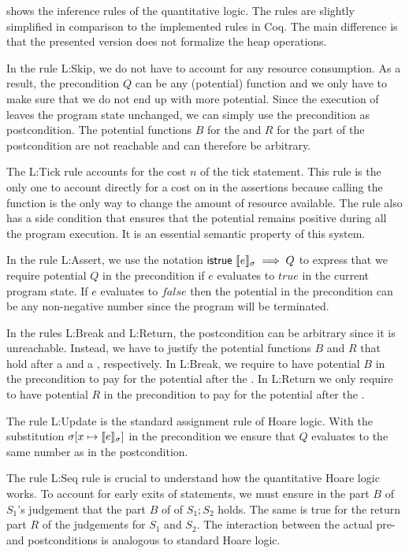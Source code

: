 \documentclass[nocopyrightspace,preprint,pldi]{sigplanconf-pldi15}
\newcommand{\pref}[1]{\prettyref{#1}}
\begin{document}
{\pref{fig:logicapp} shows the inference rules of the quantitative logic.
The rules are slightly simplified in comparison to the implemented
rules in Coq.  The main difference is that the presented version does
not formalize the heap operations.

In the rule {\sc L:Skip}, we do not have to account for any resource
consumption.  As a result, the precondition $Q$ can be any (potential)
function and we only have to make sure that we do not end up with more
potential.  Since the execution of  leaves the program
state unchanged, we can simply use the precondition as postcondition.
The potential functions $B$ for the  and $R$ for the
 part of the postcondition are not reachable and can
therefore be arbitrary.

The {\sc L:Tick} rule accounts for the cost $n$ of the tick statement.
This rule is the only one to account directly for a cost on in the
assertions because calling the  function is the only way to
change the amount of resource available.
The rule also has a side condition that ensures that the potential
remains positive during all the program execution.  It is an
essential semantic property of this system.

In the rule {\sc L:Assert}, we use the notation
$\mathsf{istrue}~\llbracket e \rrbracket_{\sigma} \implies Q$ to express that we
require potential $Q$ in the precondition if $e$ evaluates to
$\mathit{true}$ in the current program state.  If $e$ evaluates to
$\mathit{false}$ then the potential in the precondition can be any
non-negative number since the program will be terminated.

In the rules {\sc L:Break} and {\sc L:Return}, the postcondition can
be arbitrary since it is unreachable.  Instead, we have to justify the
potential functions $B$ and $R$ that hold after a  and a
, respectively.  In {\sc L:Break}, we require to have
potential $B$ in the precondition to pay for the potential after the
.  In {\sc L:Return} we only require to have potential
$R$ in the precondition to pay for the potential after the
.

The rule {\sc L:Update} is the standard assignment rule of Hoare
logic.  With the substitution $\sigma[x \mapsto \llbracket e \rrbracket_{\sigma}]$ in
the precondition we ensure that $Q$ evaluates to the same number as in
the postcondition.

The rule {\sc L:Seq} rule is crucial to understand how the
quantitative Hoare logic works.  To account for early exits of
statements, we must ensure in the  part $B$ of $S_1$'s
judgement that the  part $B$ of of $S_1;S_2$ holds. The
same is true for the return part $R$ of the judgements for $S_1$ and
$S_2$.  The interaction between the actual pre- and postconditions is
analogous to standard Hoare logic.

}
\end{document}
